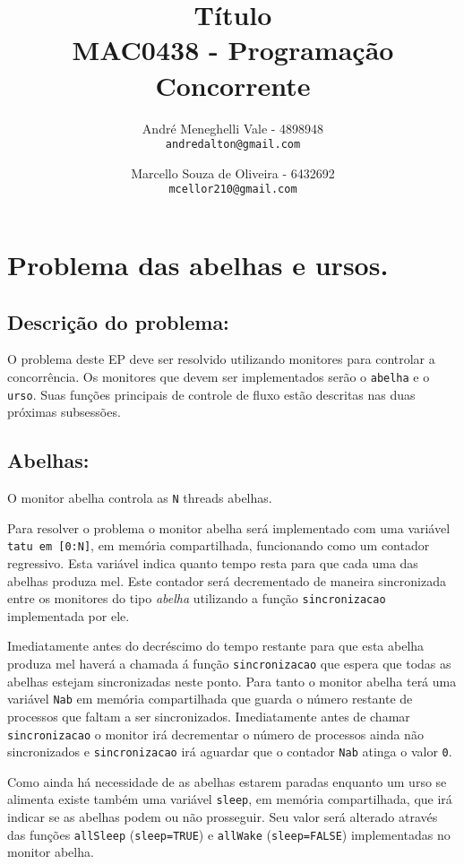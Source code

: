 \documentclass[12pt,a4paper]{article}
\title{Título\\MAC0438 - Programação Concorrente}
\author{
    André Meneghelli Vale - 4898948\\
    \texttt{andredalton@gmail.com}
    \and
    Marcello Souza de Oliveira - 6432692\\
    \texttt{mcellor210@gmail.com}
}
\date{}
\begin{document}
\maketitle

\newpage

\section{Problema das abelhas e ursos.}

\subsection{Descrição do problema:}

O problema deste EP deve ser resolvido utilizando monitores para controlar a concorrência. Os monitores que devem ser implementados serão o \verb+abelha+ e o \verb+urso+. Suas funções principais de controle de fluxo estão descritas nas duas próximas subsessões.

\subsection{Abelhas:}

O monitor abelha controla as \verb+N+ threads abelhas.

Para resolver o problema o monitor abelha será implementado com uma variável \verb+tatu em [0:N]+, em memória compartilhada, funcionando como um contador regressivo. Esta variável indica quanto tempo resta para que cada uma das abelhas produza mel. Este contador será decrementado de maneira sincronizada entre os monitores do tipo \emph{abelha} utilizando a função \verb+sincronizacao+ implementada por ele.

Imediatamente antes do decréscimo do tempo restante para que esta abelha produza mel haverá a chamada á função \verb+sincronizacao+ que espera que todas as abelhas estejam sincronizadas neste ponto. Para tanto o monitor abelha terá uma variável \verb+Nab+ em memória compartilhada que guarda o número restante de processos que faltam a ser sincronizados. Imediatamente antes de chamar \verb+sincronizacao+ o monitor irá decrementar o número de processos ainda não sincronizados e \verb+sincronizacao+ irá aguardar que o contador \verb+Nab+ atinga o valor \verb+0+.

Como ainda há necessidade de as abelhas estarem paradas enquanto um urso se alimenta existe também uma variável \verb+sleep+, em memória compartilhada, que irá indicar se as abelhas podem ou não prosseguir. Seu valor será alterado através das funções \verb+allSleep+ (\verb+sleep=TRUE+) e \verb+allWake+ (\verb+sleep=FALSE+) implementadas no monitor abelha.
\end{document}
